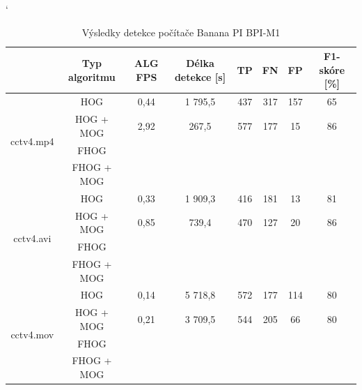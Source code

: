 \begin{table}[H]
\catcode`
\centering
\caption{Výsledky detekce počítače Banana PI BPI-M1}
\label{resultTabBPI}
\begin{tabular}{|c|c|c|c|c|c|c|c|}
\hline
                         & Typ algoritmu	& ALG FPS & Délka detekce [s] & TP 	  & FN 	& FP 	& F1-skóre [\%] \\ \hline
\multirow{4}{*}{cctv4.mp4} & HOG      		&  0,44   &   1 795,5    	  & 437   & 317 & 157  	&   65     		\\ \cline{2-8} 
                         & HOG + MOG  		&  2,92   &     267,5     	  & 577   & 177 & 15  	&   86     		\\ \cline{2-8} 
                         & FHOG       		&         &               	  &    &    &    &          \\ \cline{2-8} 
                         & FHOG + MOG 		&         &               	  &    &    &    &          \\ \hline\hline 
\multirow{4}{*}{cctv4.avi} & HOG        	&  0,33   &   1 909,3     	  & 416	  & 181  & 13   &   81     		\\ \cline{2-8} 
                         & HOG + MOG  		&  0,85   &     739,4      	  & 470   & 127  & 20   &   86          \\ \cline{2-8} 
                         & FHOG       		&         &               	  &    &    &    &          \\ \cline{2-8} 
                         & FHOG + MOG 		&         &               	  &    &    &    &          \\ \hline \hline
\multirow{4}{*}{cctv4.mov} & HOG        	&  0,14   &   5 718,8     	  & 572	  & 177  & 114  &   80		    \\ \cline{2-8} 
                         & HOG + MOG  		&  0,21   &   3 709,5      	  & 544   & 205  & 66   &   80          \\ \cline{2-8} 
                         & FHOG       		&         &               	  &    &    &    &          \\ \cline{2-8} 
                         & FHOG + MOG 		&         &               	  &    &    &    &          \\ \hline
\end{tabular}
\end{table}

